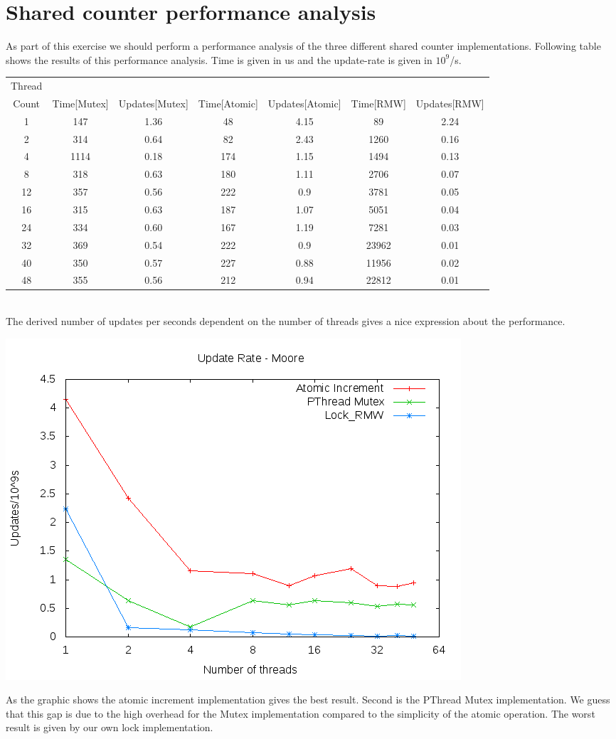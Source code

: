 \documentclass{article}
\newcommand{\enterProblemHeader}[1]{
}
\newcommand{\exitProblemHeader}[1]{
}
\newcounter{homeworkProblemCounter} %
\newcommand{\homeworkProblemName}{}
\newenvironment{homeworkProblem}[1][Problem \arabic{homeworkProblemCounter}]{ %
\stepcounter{homeworkProblemCounter} %
\renewcommand{\homeworkProblemName}{#1} %
\section{\homeworkProblemName} %
}{
}
\begin{document}
\begin{homeworkProblem}[Shared counter performance analysis]
As part of this exercise we should perform a performance analysis of the three 
different shared counter implementations. 
Following table shows the results of this performance analysis. Time is given in us and the 
update-rate is given in $10^9$/s.
\\
\begin{tabular}{|c|c|c|c|c|c|c|}\hline
   Thread \\Count & Time[Mutex] & Updates[Mutex] & Time[Atomic] & Updates[Atomic] & Time[RMW] & Updates[RMW] \\ \hline
   1 & 147 & 1.36 & 48 & 4.15 & 89 & 2.24  \\ \hline
   2 & 314 & 0.64 & 82 & 2.43 & 1260 & 0.16  \\ \hline
   4 & 1114 & 0.18 & 174 & 1.15 & 1494 & 0.13  \\ \hline
   8 & 318 & 0.63 & 180 & 1.11 & 2706 & 0.07  \\ \hline
   12 & 357 & 0.56 & 222 & 0.9 & 3781 & 0.05  \\ \hline
   16 & 315 & 0.63 & 187 & 1.07 & 5051 & 0.04  \\ \hline
   24 & 334 & 0.60 & 167 & 1.19 & 7281 & 0.03  \\ \hline
   32 & 369 & 0.54 & 222 & 0.9 & 23962 & 0.01  \\ \hline
   40 & 350 & 0.57 & 227 & 0.88 & 11956 & 0.02  \\ \hline
   48 & 355 & 0.56 & 212 & 0.94 & 22812 & 0.01  \\ \hline
\end{tabular}
\\
The derived number of updates per seconds dependent on the number of threads gives
a nice expression about the performance.
\begin{center}
\includegraphics[width=0.7\columnwidth]{Update_rate.png}
\end{center}
As the graphic shows the atomic increment implementation gives the best result. Second is 
the PThread Mutex implementation. We guess that this gap is due to the high overhead for 
the Mutex implementation compared to the simplicity of the atomic operation. The worst 
result is given by our own lock implementation. 
\end{homeworkProblem}

\clearpage
\end{document}

